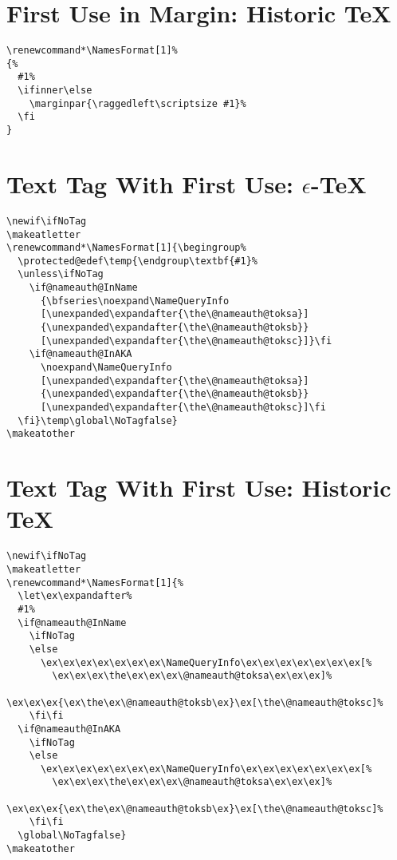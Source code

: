 \documentclass{article}
\begin{document}
\section{First Use in Margin: Historic \TeX}
\begin{verbatim}
\renewcommand*\NamesFormat[1]%
{%
  #1%
  \ifinner\else
    \marginpar{\raggedleft\scriptsize #1}%
  \fi
}
\end{verbatim}

\section{Text Tag With First Use: $\epsilon$-\TeX}
\begin{verbatim}
\newif\ifNoTag
\makeatletter
\renewcommand*\NamesFormat[1]{\begingroup%
  \protected@edef\temp{\endgroup\textbf{#1}%
  \unless\ifNoTag
    \if@nameauth@InName
      {\bfseries\noexpand\NameQueryInfo
      [\unexpanded\expandafter{\the\@nameauth@toksa}]
      {\unexpanded\expandafter{\the\@nameauth@toksb}}
      [\unexpanded\expandafter{\the\@nameauth@toksc}]}\fi
    \if@nameauth@InAKA
      \noexpand\NameQueryInfo
      [\unexpanded\expandafter{\the\@nameauth@toksa}]
      {\unexpanded\expandafter{\the\@nameauth@toksb}}
      [\unexpanded\expandafter{\the\@nameauth@toksc}]\fi
  \fi}\temp\global\NoTagfalse}
\makeatother
\end{verbatim}
\clearpage

\section{Text Tag With First Use: Historic \TeX}
\begin{verbatim}
\newif\ifNoTag
\makeatletter
\renewcommand*\NamesFormat[1]{%
  \let\ex\expandafter%
  #1%
  \if@nameauth@InName
    \ifNoTag
    \else
      \ex\ex\ex\ex\ex\ex\ex\NameQueryInfo\ex\ex\ex\ex\ex\ex\ex[%
        \ex\ex\ex\the\ex\ex\ex\@nameauth@toksa\ex\ex\ex]%
        \ex\ex\ex{\ex\the\ex\@nameauth@toksb\ex}\ex[\the\@nameauth@toksc]%
    \fi\fi
  \if@nameauth@InAKA
    \ifNoTag
    \else
      \ex\ex\ex\ex\ex\ex\ex\NameQueryInfo\ex\ex\ex\ex\ex\ex\ex[%
        \ex\ex\ex\the\ex\ex\ex\@nameauth@toksa\ex\ex\ex]%
        \ex\ex\ex{\ex\the\ex\@nameauth@toksb\ex}\ex[\the\@nameauth@toksc]%
    \fi\fi
  \global\NoTagfalse}
\makeatother
\end{verbatim}
\end{document}

